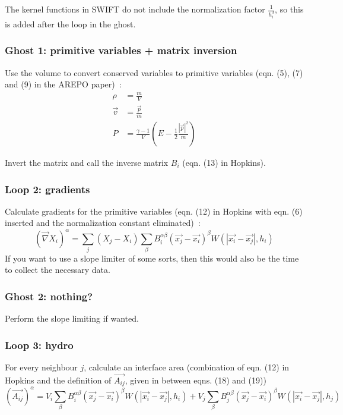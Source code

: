 The kernel functions in SWIFT do not include the normalization factor $\frac{1}{h_i^3}$, so this is added after the loop in the ghost.

\subsubsection{Ghost 1: primitive variables + matrix inversion}
Use the volume to convert conserved variables to primitive variables (eqn. (5), (7) and (9) in the AREPO paper)~:
\begin{align}
\rho &= \frac{m}{V}\\
\vec{v} &= \frac{\vec{p}}{m}\\
P &= \frac{\gamma - 1}{V}\left(E - \frac{1}{2} \frac{|\vec{p}|^2}{m}\right)
\end{align}

Invert the matrix and call the inverse matrix $B_i$ (eqn. (13) in Hopkins).

\subsubsection{Loop 2: gradients}
Calculate gradients for the primitive variables (eqn. (12) in Hopkins with eqn. (6) inserted and the normalization constant eliminated)~:
\begin{equation}
	\left(\vec{\nabla} X_i\right)^\alpha = \sum_j \left(X_j - X_i\right) \sum_\beta B_i^{\alpha \beta} (\vec{x_j}-\vec{x_i})^\beta W(|\vec{x_i}-\vec{x_j}|, h_i)
\end{equation}
If you want to use a slope limiter of some sorts, then this would also be the time to collect the necessary data.

\subsubsection{Ghost 2: nothing?}
Perform the slope limiting if wanted.

\subsubsection{Loop 3: hydro}
For every neighbour $j$, calculate an interface area (combination of eqn. (12) in Hopkins and the definition of $\vec{A_{ij}}$, given in between eqns. (18) and (19))
\begin{equation}
	\left(\vec{A_{ij}}\right)^\alpha = V_i \sum_\beta B_i^{\alpha \beta} (\vec{x_j}-\vec{x_i})^\beta W(|\vec{x_i}-\vec{x_j}|, h_i) + V_j \sum_\beta B_j^{\alpha \beta} (\vec{x_j}-\vec{x_i})^\beta W(|\vec{x_i}-\vec{x_j}|, h_j)
\end{equation}

